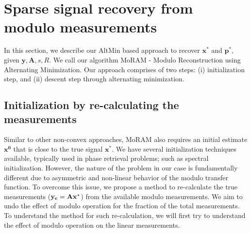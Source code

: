 \section{Sparse signal recovery from modulo measurements}
\label{sec:algo}
In this section, we describe our AltMin based approach to recover $\mathbf{x^*}$ and $\mathbf{p^*}$, given $\mathbf{y, A}, s, R$. We call our algorithm MoRAM - Modulo Reconstruction using Alternating Minimization. Our approach comprises of two steps: (i) initialization step, and (ii) descent step through alternating minimization.

\subsection{Initialization by re-calculating the measurements}
\label{sec:init}
Similar to other non-convex approaches, MoRAM also requires an initial estimate $\mathbf{{x}^0}$ that is close to the true signal $\mathbf{{x}^*}$. We have several initialization techniques available, typically used in phase retrieval problems; such as spectral initialization. However, the nature of the problem in our case is fundamentally different due to asymmetric and non-linear behavior of the modulo transfer function. To overcome this issue, we propose a method to re-calculate the true measurements ($\mathbf{y_c}= \mathbf{Ax^*}$) from the available modulo measurements. We aim to undo the effect of modulo operation for the fraction of the total measurements. To understand the method for such re-calculation, we will first try to understand the effect of modulo operation on the linear measurements.

